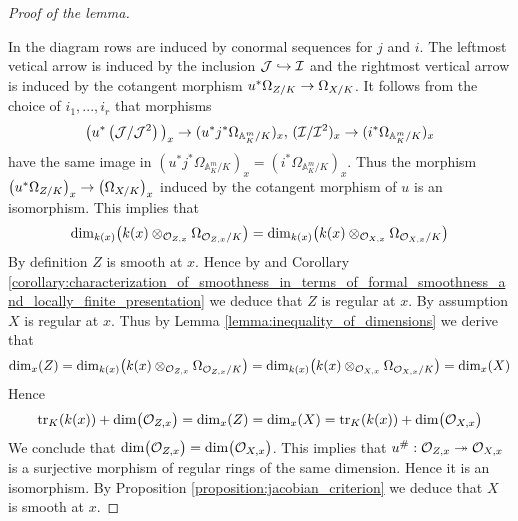 \begin{proof}[Proof of the lemma]
\begin{center}
\end{center}
In the diagram rows are induced by conormal sequences for $j$ and $i$. The leftmost vetical arrow is induced by the inclusion ${\mathcal J}\hookrightarrow {\mathcal I}$ and the rightmost vertical arrow is induced by the cotangent morphism $u^*\Omega_{Z/K}\rightarrow \Omega_{X/K}$. It follows from the choice of $i_1,...,i_r$ that morphisms
$$\big(u^*\left({\mathcal J}/{\mathcal J}^2\right)\big)_x \rightarrow (u^*j^*\Omega_{\mathbb{A}^m_K / K})_x,\,({\mathcal I}/{\mathcal I}^2)_x \rightarrow (i^*\Omega_{\mathbb{A}^m_K / K})_x$$
have the same image in $(u^*j^*\Omega_{\mathbb{A}^m_K / K})_x = (i^*\Omega_{\mathbb{A}^m_K / K})_x$. Thus the morphism $\left(u^*\Omega_{Z/K}\right)_x \rightarrow \left(\Omega_{X/K}\right)_x$ induced by the cotangent morphism of $u$ is an isomorphism. This implies that
$$\mathrm{dim}_{k(x)}\big(k(x)\otimes_{{\mathcal O}_{Z,x}}\Omega_{{\mathcal O}_{Z,x}/K}\big) = \mathrm{dim}_{k(x)}\big(k(x)\otimes_{{\mathcal O}_{X,x}}\Omega_{{\mathcal O}_{X,x}/K}\big)$$
By definition $Z$ is smooth at $x$. Hence by {\cite[Theorem 6.3]{Formally_smooth_and_unramified}} and Corollary \ref{corollary:characterization_of_smoothness_in_terms_of_formal_smoothness_and_locally_finite_presentation} we deduce that $Z$ is regular at $x$. By assumption $X$ is regular at $x$. Thus by Lemma \ref{lemma:inequality_of_dimensions} we derive that
$$\mathrm{dim}_x(Z) = \mathrm{dim}_{k(x)}\big(k(x)\otimes_{{\mathcal O}_{Z,x}}\Omega_{{\mathcal O}_{Z,x}/K}\big) = \mathrm{dim}_{k(x)}\big(k(x)\otimes_{{\mathcal O}_{X,x}}\Omega_{{\mathcal O}_{X,x}/K}\big) = \mathrm{dim}_x(X)$$
Hence
$$\mathrm{tr}_{K}(k(x)) + \mathrm{dim}\big({\mathcal O}_{Z,x}\big) = \mathrm{dim}_x(Z) = \mathrm{dim}_x(X) = \mathrm{tr}_{K}(k(x)) + \mathrm{dim}\big({\mathcal O}_{X,x}\big)$$
We conclude that $\mathrm{dim}\big({\mathcal O}_{Z,x}\big) = \mathrm{dim}\big({\mathcal O}_{X,x}\big)$. This implies that $u^{\#}:{\mathcal O}_{Z,x}\twoheadrightarrow {\mathcal O}_{X,x}$ is a surjective morphism of regular rings of the same dimension. Hence it is an isomorphism. By Proposition \ref{proposition:jacobian_criterion} we deduce that $X$ is smooth at $x$.
\end{proof}

